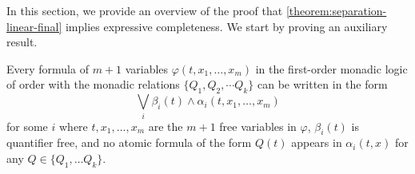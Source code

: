 \documentclass[a4paper,UKenglish,cleveref, autoref, thm-restate, numberwithinsect]{lipics-v2021}
\begin{document}
In this section, we provide an overview of the proof that \cref{theorem:separation-linear-final} implies expressive completeness. We start by proving an auxiliary result.
\begin{lemma}
    \label{lemma:pulling-out-present-lemma}
    Every formula of $m + 1$ variables $\varphi(t, x_1, \ldots, x_m)$ in the first-order monadic logic of order with the monadic relations $\{Q_1, Q_2, \cdots Q_k\}$ can be written in the form
    \begin{equation*}
        \bigvee_i \beta_i(t) \land \alpha_i(t, x_1, \ldots, x_m)
    \end{equation*}
    for some $i$ where $t, x_1, \ldots, x_m$ are the $m + 1$ free variables in $\varphi$, $\beta_i(t)$ is quantifier free, and no atomic formula of the form $Q(t)$ appears in $\alpha_i(t, x)$ for any $Q \in \{Q_1, \ldots Q_k\}$.
\end{lemma}
\end{document}
